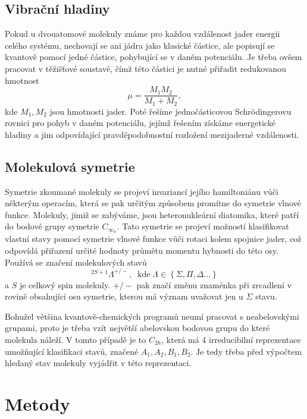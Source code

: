 \subsection{Vibrační hladiny}
Pokud u dvouatomové molekuly známe pro každou vzdálenost jader energii celého systému,
nechovají se ani jádra jako klasické částice, ale popisují se kvantově pomocí jedné částice, pohybující se v daném potenciálu. Je třeba ovšem pracovat v těžišťové soustavě,
čímž této částici je nutné přiřadit redukovanou hmotnost
\begin{equation}
\mu = \frac{M_1M_2}{M_1+M_2},
\end{equation}
kde $M_1, M_2$ jsou hmotnosti jader. Poté řešíme jednočásticovou Schrödingerovu rovnici pro pohyb v daném potenciálu, jejímž řešením získáme energetické hladiny a jim odpovídající pravděpodobnostní rozložení mezijaderné vzdálenosti.
\subsection{Molekulová symetrie}
Symetrie zkoumané molekuly se projeví invariancí jejího hamiltoniánu vůči některým operacím, která se pak určitým 
způsobem promítne do symetrie vlnové funkce.
Molekuly, jimiž se zabýváme, jsou heteronukleární diatomika, které patří do bodové grupy 
symetrie $C_{\infty_h}$. Tato symetrie se projeví možností klasifikovat vlastní stavy 
pomocí symetrie vlnové funkce vůči rotaci kolem spojnice jader, což odpovídá přiřazení určité hodnoty 
průmětu momentu hybnosti do této osy. Používá se značení molekulových stavů
\begin{equation}
^{2S+1}\Lambda^{+/-},\;\;\mathrm{kde }\;\Lambda\in\left\lbrace \Sigma, \Pi,\Delta \dots 
\right\rbrace
\end{equation}
a $S$ je celkový spin molekuly. $+/-$ pak značí změnu znaménka při zrcadlení v rovině 
obsahující osu symetrie, kterou má význam uvažovat jen u $\Sigma$ stavu.

Bohužel většina kvantově-chemických programů neumí pracovat s neabelovskými grupami, 
proto je třeba vzít největší abelovskou bodovou grupu do které molekula náleží. V tomto případě je to $C_{2h}$, která má 4 irreducibilní reprezentace umožňující klasifikaci stavů, značené $A_1, A_2, B_1, B_2$. Je tedy třeba před výpočtem hledaný stav molekuly vyjádřit v této reprezentaci.
\section{Metody}
